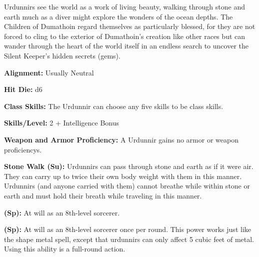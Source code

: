 
Urdunnirs see the world as a work of living beauty, walking through stone and earth much as a diver might explore the wonders of the ocean depths. The Children of Dumathoin regard themselves as particularly blessed, for they are not forced to cling to the exterior of Dumathoin’s creation like other races but can wander through the heart of the world itself in an endless search to uncover the Silent Keeper’s hidden secrets (gems).

\textbf{Alignment:} Usually Neutral

\textbf{Hit Die:} d6

\textbf{Class Skills:} The Urdunnir can choose any five skills to be class skills.

\textbf{Skills/Level:} 2 + Intelligence Bonus

\poorbab{}
\poorfor{}
\poorref{}
\goodwil{}

\begin{classtable}
\end{classtable}

\classfeatures

\textbf{Weapon and Armor Proficiency:} A Urdunnir gains no armor or weapon proficiencys.

\textbf{Stone Walk (Su):} Urdunnirs can pass through stone and earth as if it were air. They can carry up to twice their own body weight with them in this manner. Urdunnirs (and anyone carried with them) cannot breathe while within stone or earth and must hold their breath while traveling in this manner.

\textbf{ (Sp):} At will as an 8th-level sorcerer.

\textbf{ (Sp):} At will as an 8th-level sorcerer once per round. This power works just like the shape metal spell, except that urdunnirs can only affect 5 cubic feet of metal. Using this ability is a full-round action.